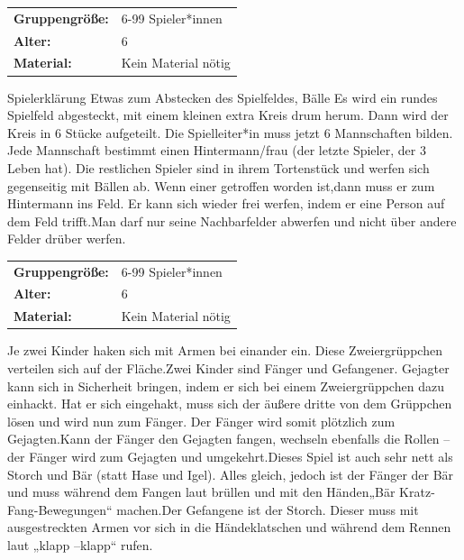 \begin{table}[H]
\begin{tabular}{>{\bfseries}lp{8cm}}
   Gruppengröße:   & 6-99 Spieler*innen\\
    Alter: & 6 \\
    Material: & Kein Material nötig \\ 
\end{tabular}
\end{table} 
 Spielerklärung
Etwas zum Abstecken des Spielfeldes, Bälle Es wird ein rundes Spielfeld abgesteckt, mit einem kleinen extra Kreis drum herum. Dann wird der Kreis in 6 Stücke aufgeteilt.  Die Spielleiter*in muss jetzt 6 Mannschaften bilden. Jede Mannschaft bestimmt einen Hintermann/frau (der letzte Spieler, der 3 Leben hat). Die restlichen Spieler sind in ihrem Tortenstück und werfen sich gegenseitig mit Bällen ab. Wenn einer getroffen worden ist,dann muss er zum Hintermann ins Feld. Er kann sich wieder frei werfen, indem er eine Person auf dem Feld trifft.Man darf nur seine Nachbarfelder abwerfen und nicht über andere Felder drüber werfen. \\



\begin{table}[H]
\begin{tabular}{>{\bfseries}lp{8cm}}
   Gruppengröße:   & 6-99 Spieler*innen\\
    Alter: & 6 \\
    Material: & Kein Material nötig \\
\end{tabular}
\end{table} 

Je zwei Kinder haken sich mit Armen bei einander ein. Diese Zweiergrüppchen verteilen sich auf der Fläche.Zwei Kinder sind Fänger und Gefangener. Gejagter kann sich in Sicherheit bringen, indem er sich bei einem Zweiergrüppchen dazu einhackt. Hat er sich eingehakt, muss sich der äußere dritte von dem Grüppchen lösen und wird nun zum Fänger. Der Fänger wird somit plötzlich zum Gejagten.Kann der Fänger den Gejagten fangen, wechseln ebenfalls die Rollen –der Fänger wird zum Gejagten und umgekehrt.Dieses Spiel ist auch sehr nett als Storch und Bär (statt Hase und Igel). Alles gleich, jedoch ist der Fänger der Bär und muss während dem Fangen laut brüllen und mit den Händen„Bär Kratz-Fang-Bewegungen“ machen.Der Gefangene ist der Storch. Dieser muss mit ausgestreckten Armen vor sich in die Händeklatschen und während dem Rennen laut „klapp –klapp“ rufen. \\



